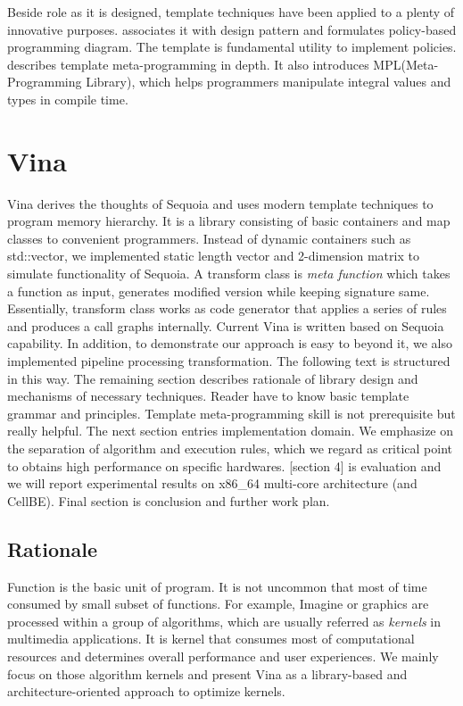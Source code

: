\documentclass[a4paper, 11pt]{article}
\begin{document}
Beside role as it is designed,  template techniques have been applied to a plenty of innovative purposes. \cite{modernc++} associates it with design pattern and formulates policy-based programming diagram. The template is fundamental utility to implement policies. \cite{c++metaprog} describes template meta-programming in depth. It also introduces MPL(Meta-Programming Library), which helps programmers manipulate integral values and types in compile time. 
\section{Vina}
Vina derives the thoughts of Sequoia and uses modern template techniques to program memory hierarchy. It is a library consisting of basic containers and map classes to convenient programmers. Instead of dynamic containers such as std::vector, we implemented static length vector and 2-dimension matrix to simulate functionality of Sequoia. A transform class is \emph{meta function} which takes a function as input, generates modified version while keeping signature same. Essentially, transform class works as code generator that applies a series of rules and produces a call graphs internally. Current Vina is written based on Sequoia capability. In addition, to demonstrate our approach is easy to beyond it, we also implemented pipeline processing transformation. The following text is structured in this way. The remaining section describes rationale of library design and mechanisms of necessary techniques. Reader have to know basic template grammar and principles. Template meta-programming skill is not prerequisite but really helpful.  The next section entries implementation domain.  We emphasize on the separation of algorithm and execution rules, which we regard as critical point to obtains high performance on specific hardwares. [section 4] is evaluation and we will report experimental results  on x86\_64 multi-core architecture (and CellBE). Final section is conclusion and further work plan.
\subsection{Rationale}
Function is the basic unit of program. It is not uncommon  that most of time consumed by small subset of functions. For example, Imagine or graphics are processed within a group of algorithms, which are usually referred as  \emph{kernels} in multimedia applications. It is kernel that consumes most of computational resources and determines overall performance and  user experiences. We mainly focus on those algorithm kernels and present Vina as a library-based and architecture-oriented approach to optimize kernels.
\end{document}
